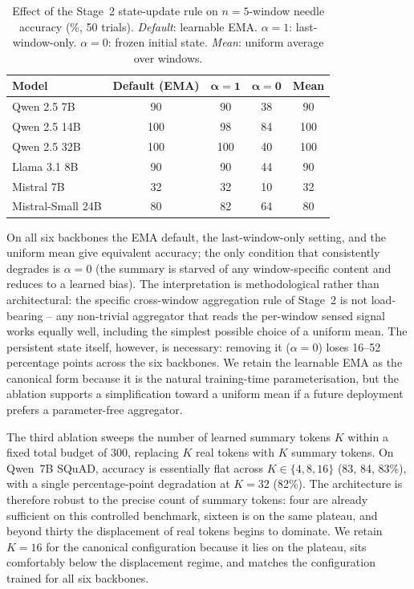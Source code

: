 \begin{table}[t]
\caption{Effect of the Stage~2 state-update rule on $n{=}5$-window needle accuracy (\%, 50 trials). \emph{Default}: learnable EMA. $\alpha{=}1$: last-window-only. $\alpha{=}0$: frozen initial state. \emph{Mean}: uniform average over windows.}
\label{tab:bio}
\centering
\small
\setlength{\tabcolsep}{6pt}
\begin{tabular}{l c c c c}
\toprule
\textbf{Model} & \textbf{Default (EMA)} & $\boldsymbol{\alpha{=}1}$ & $\boldsymbol{\alpha{=}0}$ & \textbf{Mean} \\
\midrule
Qwen 2.5 7B       & 90  & 90  & 38 & 90  \\
Qwen 2.5 14B      & 100 & 98  & 84 & 100 \\
Qwen 2.5 32B      & 100 & 100 & 40 & 100 \\
Llama 3.1 8B      & 90  & 90  & 44 & 90  \\
Mistral 7B        & 32  & 32  & 10 & 32  \\
Mistral-Small 24B & 80  & 82  & 64 & 80  \\
\bottomrule
\end{tabular}
\end{table}

On all six backbones the EMA default, the last-window-only setting, and the uniform mean give equivalent accuracy; the only condition that consistently degrades is $\alpha{=}0$ (the summary is starved of any window-specific content and reduces to a learned bias). The interpretation is methodological rather than architectural: the specific cross-window aggregation rule of Stage~2 is not load-bearing -- any non-trivial aggregator that reads the per-window sensed signal works equally well, including the simplest possible choice of a uniform mean. The persistent state itself, however, is necessary: removing it ($\alpha{=}0$) loses 16--52 percentage points across the six backbones. We retain the learnable EMA as the canonical form because it is the natural training-time parameterisation, but the ablation supports a simplification toward a uniform mean if a future deployment prefers a parameter-free aggregator.

The third ablation sweeps the number of learned summary tokens $K$ within a fixed total budget of 300, replacing $K$ real tokens with $K$ summary tokens. On Qwen~7B SQuAD, accuracy is essentially flat across $K{\in}\{4, 8, 16\}$ (83, 84, 83\%), with a single percentage-point degradation at $K{=}32$ (82\%). The architecture is therefore robust to the precise count of summary tokens: four are already sufficient on this controlled benchmark, sixteen is on the same plateau, and beyond thirty the displacement of real tokens begins to dominate. We retain $K{=}16$ for the canonical configuration because it lies on the plateau, sits comfortably below the displacement regime, and matches the configuration trained for all six backbones.

